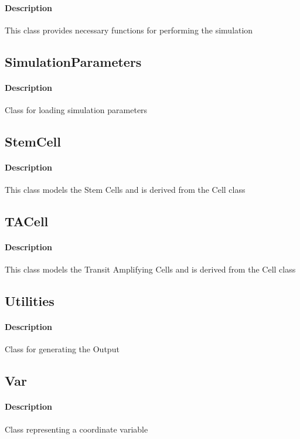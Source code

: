 \documentclass[11pt]{report}
\begin{document}
  \paragraph{Description}
  This class provides necessary functions for performing the simulation
  \subsection{\color{blue}SimulationParameters}
  \paragraph{Description}
  Class for loading simulation parameters
  \subsection{\color{blue}StemCell}
  \paragraph{Description}
  This class models the Stem Cells and is derived from the Cell class
  \subsection{\color{blue}TACell}
  \paragraph{Description}
  This class models the Transit Amplifying Cells and is derived from the Cell class
  \subsection{\color{blue}Utilities}
  \paragraph{Description}
  Class for generating the Output
  \subsection{\color{blue}Var}
  \paragraph{Description}
  Class representing a coordinate variable
  \pagebreak
\end{document}
